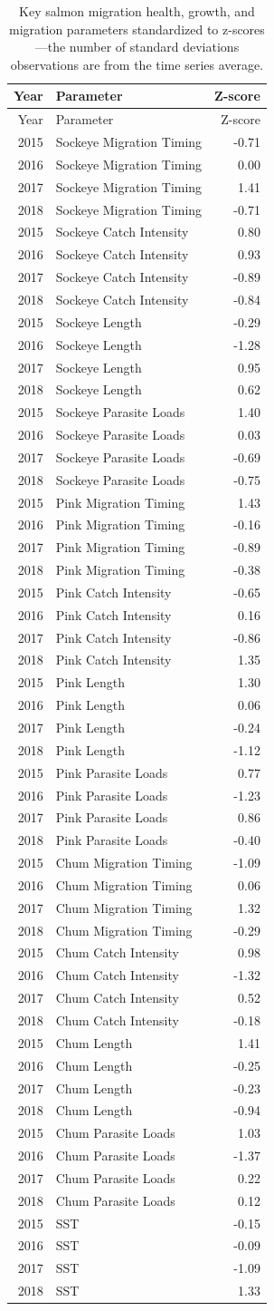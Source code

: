 \documentclass[fleqn,10pt]{wlpeerj} %
\begin{document}
\begin{longtable}[]{@{}rlr@{}}
\caption{\label{tab:z} Key salmon migration health, growth, and migration
parameters standardized to z-scores---the number of standard deviations
observations are from the time series average.}\tabularnewline
\toprule
Year & Parameter & Z-score\tabularnewline
\midrule
\endfirsthead
\toprule
Year & Parameter & Z-score\tabularnewline
\midrule
\endhead
2015 & Sockeye Migration Timing & -0.71\tabularnewline
2016 & Sockeye Migration Timing & 0.00\tabularnewline
2017 & Sockeye Migration Timing & 1.41\tabularnewline
2018 & Sockeye Migration Timing & -0.71\tabularnewline
2015 & Sockeye Catch Intensity & 0.80\tabularnewline
2016 & Sockeye Catch Intensity & 0.93\tabularnewline
2017 & Sockeye Catch Intensity & -0.89\tabularnewline
2018 & Sockeye Catch Intensity & -0.84\tabularnewline
2015 & Sockeye Length & -0.29\tabularnewline
2016 & Sockeye Length & -1.28\tabularnewline
2017 & Sockeye Length & 0.95\tabularnewline
2018 & Sockeye Length & 0.62\tabularnewline
2015 & Sockeye Parasite Loads & 1.40\tabularnewline
2016 & Sockeye Parasite Loads & 0.03\tabularnewline
2017 & Sockeye Parasite Loads & -0.69\tabularnewline
2018 & Sockeye Parasite Loads & -0.75\tabularnewline
2015 & Pink Migration Timing & 1.43\tabularnewline
2016 & Pink Migration Timing & -0.16\tabularnewline
2017 & Pink Migration Timing & -0.89\tabularnewline
2018 & Pink Migration Timing & -0.38\tabularnewline
2015 & Pink Catch Intensity & -0.65\tabularnewline
2016 & Pink Catch Intensity & 0.16\tabularnewline
2017 & Pink Catch Intensity & -0.86\tabularnewline
2018 & Pink Catch Intensity & 1.35\tabularnewline
2015 & Pink Length & 1.30\tabularnewline
2016 & Pink Length & 0.06\tabularnewline
2017 & Pink Length & -0.24\tabularnewline
2018 & Pink Length & -1.12\tabularnewline
2015 & Pink Parasite Loads & 0.77\tabularnewline
2016 & Pink Parasite Loads & -1.23\tabularnewline
2017 & Pink Parasite Loads & 0.86\tabularnewline
2018 & Pink Parasite Loads & -0.40\tabularnewline
2015 & Chum Migration Timing & -1.09\tabularnewline
2016 & Chum Migration Timing & 0.06\tabularnewline
2017 & Chum Migration Timing & 1.32\tabularnewline
2018 & Chum Migration Timing & -0.29\tabularnewline
2015 & Chum Catch Intensity & 0.98\tabularnewline
2016 & Chum Catch Intensity & -1.32\tabularnewline
2017 & Chum Catch Intensity & 0.52\tabularnewline
2018 & Chum Catch Intensity & -0.18\tabularnewline
2015 & Chum Length & 1.41\tabularnewline
2016 & Chum Length & -0.25\tabularnewline
2017 & Chum Length & -0.23\tabularnewline
2018 & Chum Length & -0.94\tabularnewline
2015 & Chum Parasite Loads & 1.03\tabularnewline
2016 & Chum Parasite Loads & -1.37\tabularnewline
2017 & Chum Parasite Loads & 0.22\tabularnewline
2018 & Chum Parasite Loads & 0.12\tabularnewline
2015 & SST & -0.15\tabularnewline
2016 & SST & -0.09\tabularnewline
2017 & SST & -1.09\tabularnewline
2018 & SST & 1.33\tabularnewline
\bottomrule
\end{longtable}
\end{document}
